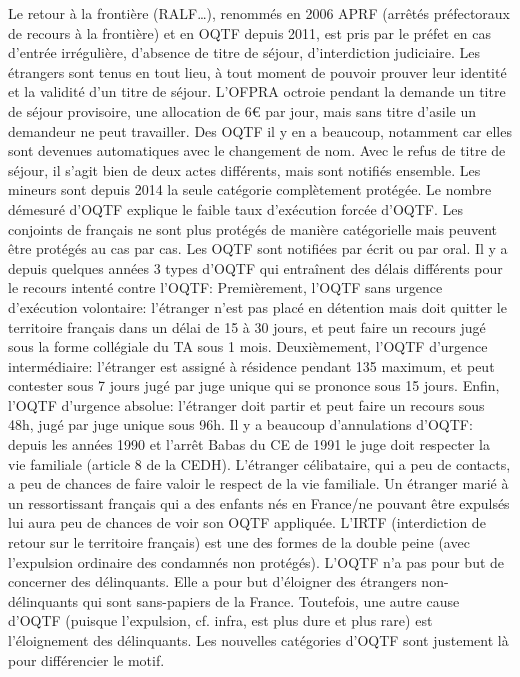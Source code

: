 \documentclass[math]{cours}
\begin{document}
Le retour à la frontière (RALF\ldots), renommés en 2006 APRF (arrêtés préfectoraux de recours à la frontière) et en OQTF depuis 2011, est pris par le préfet en cas d'entrée irrégulière, d'absence de titre de séjour, d'interdiction judiciaire.
Les étrangers sont tenus en tout lieu, à tout moment de pouvoir prouver leur identité et la validité d'un titre de séjour.
L'OFPRA octroie pendant la demande un titre de séjour provisoire, une allocation de 6€ par jour, mais sans titre d'asile un demandeur ne peut travailler.
Des OQTF il y en a beaucoup, notamment car elles sont devenues automatiques avec le changement de nom.
Avec le refus de titre de séjour, il s'agit bien de deux actes différents, mais sont notifiés ensemble.
Les mineurs sont depuis 2014 la seule catégorie complètement protégée.
Le nombre démesuré d'OQTF explique le faible taux d'exécution forcée d'OQTF.
Les conjoints de français ne sont plus protégés de manière catégorielle mais peuvent être protégés au cas par cas.
Les OQTF sont notifiées par écrit ou par oral.
Il y a depuis quelques années 3 types d'OQTF qui entraînent des délais différents pour le recours intenté contre l'OQTF:
Premièrement, l'OQTF sans urgence d'exécution volontaire: l'étranger n'est pas placé en détention mais doit quitter le territoire français dans un délai de 15 à 30 jours, et peut faire un recours jugé sous la forme collégiale du TA sous 1 mois.
Deuxièmement, l'OQTF d'urgence intermédiaire: l'étranger est assigné à résidence pendant 135 maximum, et peut contester sous 7 jours jugé par juge unique qui se prononce sous 15 jours.
Enfin, l'OQTF d'urgence absolue: l'étranger doit partir et peut faire un recours sous 48h, jugé par juge unique sous 96h.
Il y a beaucoup d'annulations d'OQTF: depuis les années 1990 et l'arrêt Babas du CE de 1991 le juge doit respecter la vie familiale (article 8 de la CEDH).
L'étranger célibataire, qui a peu de contacts, a peu de chances de faire valoir le respect de la vie familiale. Un étranger marié à un ressortissant français qui a des enfants nés en France/ne pouvant être expulsés lui aura peu de chances de voir son OQTF appliquée.
L'IRTF (interdiction de retour sur le territoire français) est une des formes de la double peine (avec l'expulsion ordinaire des condamnés non protégés).
L'OQTF n'a pas pour but de concerner des délinquants. Elle a pour but d'éloigner des étrangers non-délinquants qui sont sans-papiers de la France. Toutefois, une autre cause d'OQTF (puisque l'expulsion, cf. infra, est plus dure et plus rare) est l'éloignement des délinquants.
Les nouvelles catégories d'OQTF sont justement là pour différencier le motif.
\end{document}
